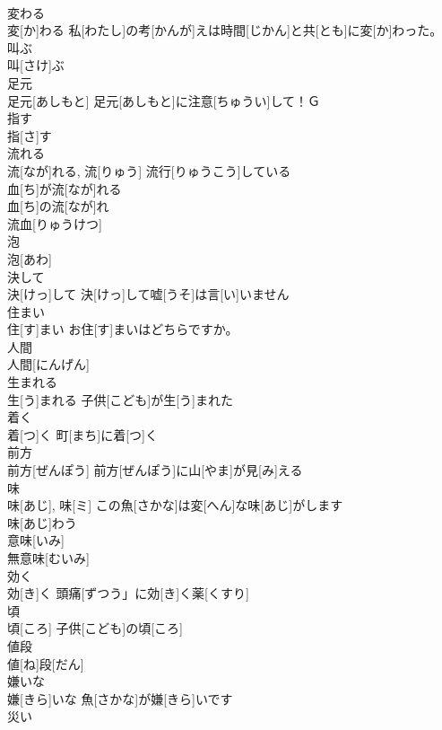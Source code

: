 \documentclass[8pt]{extreport}
\begin{document}
\begin{CJK}{UTF8}{min}
\\	変わる	
\\	変[か]わる	私[わたし]の考[かんが]えは時間[じかん]と共[とも]に変[か]わった。 
\\	叫ぶ	
\\	叫[さけ]ぶ	
\\	足元	
\\	足元[あしもと]	足元[あしもと]に注意[ちゅうい]して！Ｇ
\\	指す	
\\	指[さ]す	
\\	流れる	
\\	流[なが]れる, 流[りゅう]	流行[りゅうこう]している 
\\	血[ち]が流[なが]れる 
\\	血[ち]の流[なが]れ 
\\	流血[りゅうけつ] 
\\	泡	
\\	泡[あわ]	
\\	決して	
\\	決[けっ]して	決[けっ]して嘘[うそ]は言[い]いません 
\\	住まい	
\\	住[す]まい	お住[す]まいはどちらですか。
\\	人間	
\\	人間[にんげん]	
\\	生まれる	
\\	生[う]まれる	子供[こども]が生[う]まれた 
\\	着く	
\\	着[つ]く	町[まち]に着[つ]く 
\\	前方	
\\	前方[ぜんぽう]	前方[ぜんぽう]に山[やま]が見[み]える 
\\	味	
\\	味[あじ], 味[ミ]	この魚[さかな]は変[へん]な味[あじ]がします 
\\	味[あじ]わう 
\\	意味[いみ] 
\\	無意味[むいみ] 
\\	効く	
\\	効[き]く	頭痛[ずつう」に効[き]く薬[くすり] 
\\	頃	
\\	頃[ころ]	子供[こども]の頃[ころ] 
\\	値段	
\\	値[ね]段[だん]	
\\	嫌いな	
\\	嫌[きら]いな	魚[さかな]が嫌[きら]いです 
\\	災い	

\end{CJK}
\end{document}
